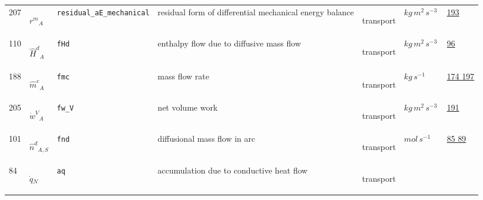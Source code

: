 \begin{longtable}{|p{1cm}|p{2.5cm}|p{4.5cm}|p{8cm}|p{3.0cm}|p{3cm}|p{1cm}|}
                 \\
            207
             & \hypertarget{"v:207"}{ $ {{r^m}}{_{A}} $}
             & \verb|residual_aE_mechanical|
             & residual form of differential mechanical energy balance
             & \begin{lay}transport \end{lay}
             & $ kg \,m^{2} \,s^{-3} \, $
             &                 \hyperlink{"e:193"}{ 193 }
                 \\
            110
             & \hypertarget{"v:110"}{ $ {{\hat{H}^d}}{_{A}} $}
             & \verb|fHd|
             & enthalpy flow due to diffusive mass flow
             & \begin{lay}transport \end{lay}
             & $ kg \,m^{2} \,s^{-3} \, $
             &                 \hyperlink{"e:96"}{ 96 }
                 \\
            188
             & \hypertarget{"v:188"}{ $ {{\hat{m}^c}}{_{A}} $}
             & \verb|fmc|
             & mass flow rate 
             & \begin{lay}transport \end{lay}
             & $ kg \,s^{-1} \, $
             &                 \hyperlink{"e:174"}{ 174 }
                                 \hyperlink{"e:197"}{ 197 }
                 \\
            205
             & \hypertarget{"v:205"}{ $ {{\dot{w}^V}}{_{A}} $}
             & \verb|fw_V|
             & net volume work
             & \begin{lay}transport \end{lay}
             & $ kg \,m^{2} \,s^{-3} \, $
             &                 \hyperlink{"e:191"}{ 191 }
                 \\
            101
             & \hypertarget{"v:101"}{ $ {{\hat{n}^d}}{_{A, S}} $}
             & \verb|fnd|
             & diffusional mass flow in arc
             & \begin{lay}transport \end{lay}
             & $ mol \,s^{-1} \, $
             &                 \hyperlink{"e:85"}{ 85 }
                                 \hyperlink{"e:89"}{ 89 }
                 \\
            84
             & \hypertarget{"v:84"}{ $ {{\dot{q}}}{_{N}} $}
             & \verb|aq|
             & accumulation due to conductive heat flow
             & \begin{lay}transport \end{lay}

\end{longtable}
